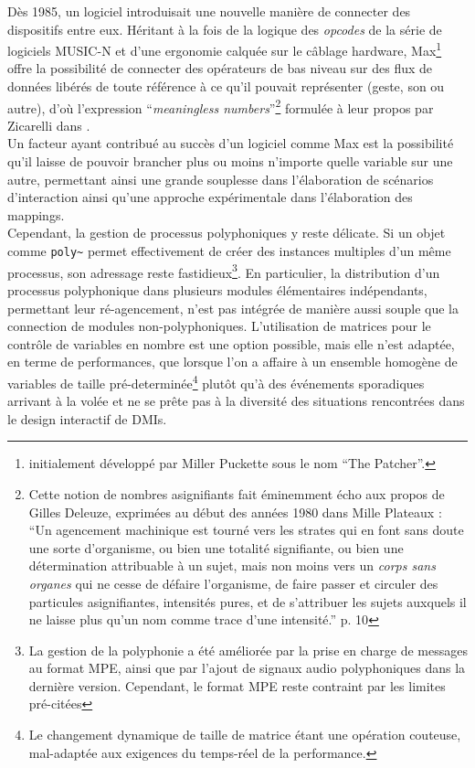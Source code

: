 \noindent Dès 1985, un logiciel introduisait une nouvelle manière de connecter des dispositifs entre eux. Héritant à la fois de la logique des \textit{opcodes} de la série de logiciels \gls{MUSIC-N} et d'une ergonomie calquée sur le câblage hardware, Max\footnote{initialement développé par Miller Puckette sous le nom ``The Patcher''.} offre la possibilité de connecter des opérateurs de bas niveau sur des flux de données libérés de toute référence à ce qu'il pouvait représenter (geste, son ou autre), d'où l'expression ``\textit{meaningless numbers}''\footnote{Cette notion de nombres asignifiants fait éminemment écho aux propos de Gilles Deleuze, exprimées au début des années 1980 dans Mille Plateaux \cite{deleuze_mille_1980} : ``Un agencement machinique est tourné vers les strates qui en font sans doute une sorte d'organisme, ou bien une totalité signifiante, ou bien une détermination attribuable à un sujet, mais non moins vers un \textit{corps sans organes} qui ne cesse de défaire l'organisme, de faire passer et circuler des particules asignifiantes, intensités pures, et de s'attribuer les sujets auxquels il ne laisse plus qu'un nom comme trace d'une intensité.'' p. 10} formulée à leur propos par Zicarelli dans \cite{zicarelli_communicating_1991}.\\
\indent Un facteur ayant contribué au succès d'un logiciel comme Max est la possibilité qu'il laisse de pouvoir brancher plus ou moins n'importe quelle variable sur une autre, permettant ainsi une grande souplesse dans l'élaboration de scénarios d'interaction ainsi qu'une approche expérimentale dans l'élaboration des \glspl{mapping}.\\
\indent Cependant, la gestion de processus polyphoniques y reste délicate. Si un objet comme \verb|poly~| permet effectivement de créer des instances multiples d'un même processus, son adressage reste fastidieux\footnote{La gestion de la polyphonie a été améliorée par la prise en charge de messages au format \gls{MPE}, ainsi que par l'ajout de signaux audio polyphoniques dans la dernière version. Cependant, le format \gls{MPE} reste contraint par les limites pré-citées}. En particulier, la distribution d'un processus polyphonique dans plusieurs modules élémentaires indépendants, permettant leur ré-agencement, n'est pas intégrée de manière aussi souple que la connection de modules non-polyphoniques. L'utilisation de matrices pour le contrôle de variables en nombre est une option possible, mais elle n'est adaptée, en terme de performances, que lorsque l'on a affaire à un ensemble homogène de variables de taille pré-determinée\footnote{Le changement dynamique de taille de matrice étant une opération couteuse, mal-adaptée aux exigences du temps-réel de la performance.} plutôt qu'à des événements sporadiques arrivant à la volée et ne se prête pas à la diversité des situations rencontrées dans le design interactif de \glspl{DMI}.

